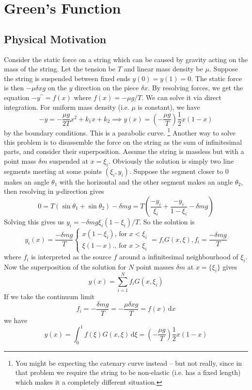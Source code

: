 \section{Green's Function}
\subsection{Physical Motivation}
Consider the static force on a string which can be caused by gravity acting on the mass of the string.
Let the tension be $T$ and linear mass density be $\mu$.
Suppose the string is suspended between fixed ends $y(0)=y(1)=0$.
The static force is then $-\mu\delta xg$ on the $y$ direction on the piece $\delta x$.
By resolving forces, we get the equation $-y^{\prime\prime}=f(x)$ where $f(x)=-\mu g/T$.
We can solve it via direct integration.
For uniform mass density (i.e. $\mu$ is constant), we have
$$-y=-\frac{\mu g}{2T}x^2+k_1x+k_2\implies y(x)=\left( -\frac{\mu g}{T} \right)\frac{1}{2}x(1-x)$$
by the boundary conditions.
This is a parabolic curve.
\footnote{You might be expecting the catenary curve instead -- but not really, since in that problem we require the string to be non-elastic (i.e. has a fixed length) which makes it a completely different situation.}
Another way to solve this problem is to disassemble the force on the string as the sum of infinitesimal parts, and consider their superposition.
Assume the string is massless but with a point mass $\delta m$ suspended at $x=\xi_i$.
Obviously the solution is simply two line segments meeting at some points $(\xi_i,y_i)$.
Suppose the segment closer to $0$ makes an angle $\theta_1$ with the horizontal and the other segment makes an angle $\theta_2$, then resolving in $y$-direction gives
$$0=T(\sin\theta_1+\sin\theta_2)-\delta mg=T\left( \frac{-y_i}{\xi_i}+\frac{-y_i}{1-\xi_i}-\delta mg \right)$$
Solving this gives us $y_i=-\delta mg\xi_i(1-\xi_i)/T$.
So the solution is
$$y_i(x)=\frac{-\delta mg}{T}\begin{cases}
    x(1-\xi_i)\text{, for $x<\xi_i$}\\
    \xi(1-x)\text{., for $x>\xi_i$}
\end{cases}=f_iG(x,\xi),f_i=\frac{-\delta mg}{T}$$
where $f_i$ is interpreted as the source $f$ around a infinitesimal neighbourhood of $\xi_i$.
Now the superposition of the solution for $N$ point masses $\delta m$ at $x=\{\xi_i\}$ gives
$$y(x)=\sum_{i=1}^Nf_iG(x,\xi_i)$$
If we take the continuum limit
$$f_i=-\frac{\delta mg}{T}=-\frac{\mu\delta x g}{T}=f(x)\,\mathrm dx$$
we have
$$y(x)=\int_0^1f(\xi)G(x,\xi)\,\mathrm d\xi=\left( -\frac{\mu g}{T} \right)\frac{1}{2}x(1-x)$$
